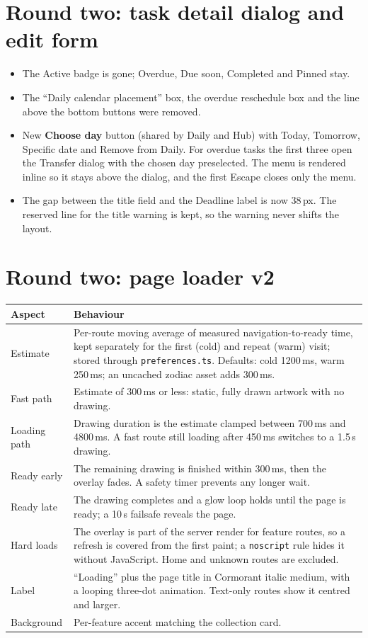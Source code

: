 \documentclass[11pt,a4paper]{article}
\begin{document}
\section{Round two: task detail dialog and edit form}
\begin{itemize}
\item The Active badge is gone; Overdue, Due soon, Completed and Pinned stay.
\item The ``Daily calendar placement'' box, the overdue reschedule box and the line above the bottom buttons were removed.
\item New \textbf{Choose day} button (shared by Daily and Hub) with Today, Tomorrow, Specific date and Remove from Daily. For overdue tasks the first three open the Transfer dialog with the chosen day preselected. The menu is rendered inline so it stays above the dialog, and the first Escape closes only the menu.
\item The gap between the title field and the Deadline label is now 38\,px. The reserved line for the title warning is kept, so the warning never shifts the layout.
\end{itemize}

\section{Round two: page loader v2}
\begin{longtable}{@{}p{3.2cm}p{11.6cm}@{}}
\toprule
Aspect & Behaviour \\
\midrule
\endhead
Estimate & Per-route moving average of measured navigation-to-ready time, kept separately for the first (cold) and repeat (warm) visit; stored through \texttt{preferences.ts}. Defaults: cold 1200\,ms, warm 250\,ms; an uncached zodiac asset adds 300\,ms. \\
Fast path & Estimate of 300\,ms or less: static, fully drawn artwork with no drawing. \\
Loading path & Drawing duration is the estimate clamped between 700\,ms and 4800\,ms. A fast route still loading after 450\,ms switches to a 1.5\,s drawing. \\
Ready early & The remaining drawing is finished within 300\,ms, then the overlay fades. A safety timer prevents any longer wait. \\
Ready late & The drawing completes and a glow loop holds until the page is ready; a 10\,s failsafe reveals the page. \\
Hard loads & The overlay is part of the server render for feature routes, so a refresh is covered from the first paint; a \texttt{noscript} rule hides it without JavaScript. Home and unknown routes are excluded. \\
Label & ``Loading'' plus the page title in Cormorant italic medium, with a looping three-dot animation. Text-only routes show it centred and larger. \\
Background & Per-feature accent matching the collection card. \\
\bottomrule
\end{longtable}
\end{document}
